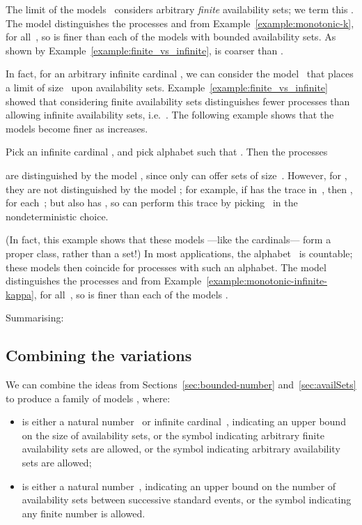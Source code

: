 The limit of the models~ considers arbitrary \emph{finite}
availability sets; we term this .  The model
 distinguishes the processes  and  from
Example~\ref{example:monotonic-k}, for all~, so is finer than each of the
models with bounded availability sets.  As shown by
Example~\ref{example:finite_vs_infinite},  is coarser
than .


In fact, for an arbitrary infinite cardinal , we can consider the
model~ that places a limit of size~ upon availability sets.
Example~\ref{example:finite_vs_infinite} showed that considering finite
availability sets distinguishes fewer processes than allowing infinite
availability sets, i.e.~.  The following
example shows that the models become finer as  increases.
\begin{example}
\label{example:monotonic-infinite-kappa}
Pick an infinite cardinal , and pick alphabet  such that
.  Then the processes

are distinguished by the model , since only  can offer
sets of size~.  However, for , they are not
distinguished by the model ; for example, if  has the
trace  in~, then
, for each~; but also  has , so  can perform this trace
by picking~ in the nondeterministic choice.
\end{example}
(In fact, this example shows that these models ---like the cardinals--- form a
proper class, rather than a set!)  In most applications, the alphabet~
is countable; these models then coincide for processes with such an alphabet.
The model  distinguishes the processes  and
 from Example~\ref{example:monotonic-infinite-kappa}, for
all~, so is finer than each of the models .

Summarising:










\subsection{Combining the variations}


We can combine the ideas from Sections~\ref{sec:bounded-number}
and~\ref{sec:availSets} to produce a family of models , where:
\begin{itemize}
\item 
 is either a natural number~ or infinite cardinal~, indicating
  an upper bound on the size of availability sets, or the symbol 
  indicating arbitrary finite availability sets are allowed, or the symbol
   indicating arbitrary availability sets are allowed;

\item
 is either a natural number~, indicating an upper bound on the number
  of availability sets between successive standard events, or the symbol
   indicating any finite number is allowed.
\end{itemize}



